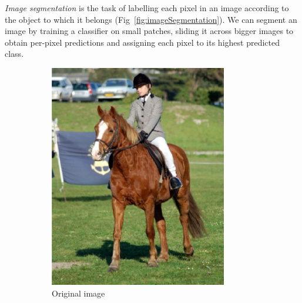 \emph{Image segmentation} is the task of labelling each pixel in an image according to the object to which it belongs (Fig~\ref{fig:imageSegmentation}).
We can segment an image by training a classifier on small patches, sliding it across bigger images to obtain per-pixel predictions and assigning each pixel to its highest predicted class.
\begin{figure}[h]
	\centering
	\begin{subfigure}{0.26\textwidth}
                \includegraphics[width=\textwidth]{plots/segmentationImage.png}
		\caption{Original image}
        \end{subfigure}
	~
	\begin{subfigure}{0.26\textwidth}

\end{subfigure}
\end{figure}
